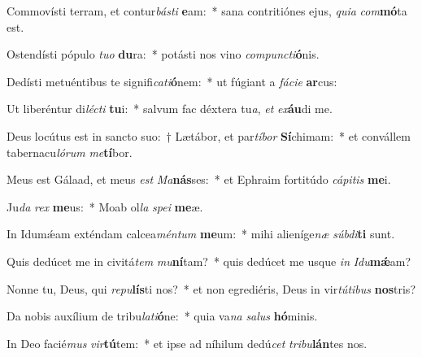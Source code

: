 \item Commovísti terram, et contur\textit{bás}\textit{ti} \textbf{e}am:~* sana contritiónes ejus, \textit{qui}\textit{a} \textit{com}\textbf{mó}ta est.
\item Ostendísti pópulo \textit{tu}\textit{o} \textbf{du}ra:~* potásti nos vino \textit{com}\textit{punc}\textit{ti}\textbf{ó}nis.
\item Dedísti metuéntibus te signifi\textit{ca}\textit{ti}\textbf{ó}nem:~* ut fúgiant a \textit{fá}\textit{ci}\textit{e} \textbf{ar}cus:
\item Ut liberéntur di\textit{léc}\textit{ti} \textbf{tu}i:~* salvum fac déxtera tu\textit{a}, \textit{et} \textit{ex}\textbf{áu}di me.
\item Deus locútus est in sancto suo:~† Lætábor, et par\textit{tí}\textit{bor} \textbf{Sí}chimam:~* et convállem tabernacu\textit{ló}\textit{rum} \textit{me}\textbf{tí}bor.
\item Meus est Gálaad, et meus \textit{est} \textit{Ma}\textbf{nás}ses:~* et Ephraim fortitúdo \textit{cá}\textit{pi}\textit{tis} \textbf{me}i.
\item Ju\textit{da} \textit{rex} \textbf{me}us:~* Moab ol\textit{la} \textit{spe}\textit{i} \textbf{me}æ.
\item In Idumǽam exténdam calcea\textit{mén}\textit{tum} \textbf{me}um:~* mihi alieníge\textit{næ} \textit{súb}\textit{di}\textbf{ti} sunt.
\item Quis dedúcet me in civitá\textit{tem} \textit{mu}\textbf{ní}tam?~* quis dedúcet me usque \textit{in} \textit{I}\textit{du}\textbf{mǽ}am?
\item Nonne tu, Deus, qui \textit{re}\textit{pu}\textbf{lís}ti nos?~* et non egrediéris, Deus in vir\textit{tú}\textit{ti}\textit{bus} \textbf{nos}tris?
\item Da nobis auxílium de tribu\textit{la}\textit{ti}\textbf{ó}ne:~* quia va\textit{na} \textit{sa}\textit{lus} \textbf{hó}minis.
\item In Deo facié\textit{mus} \textit{vir}\textbf{tú}tem:~* et ipse ad níhilum dedú\textit{cet} \textit{tri}\textit{bu}\textbf{lán}tes nos.
